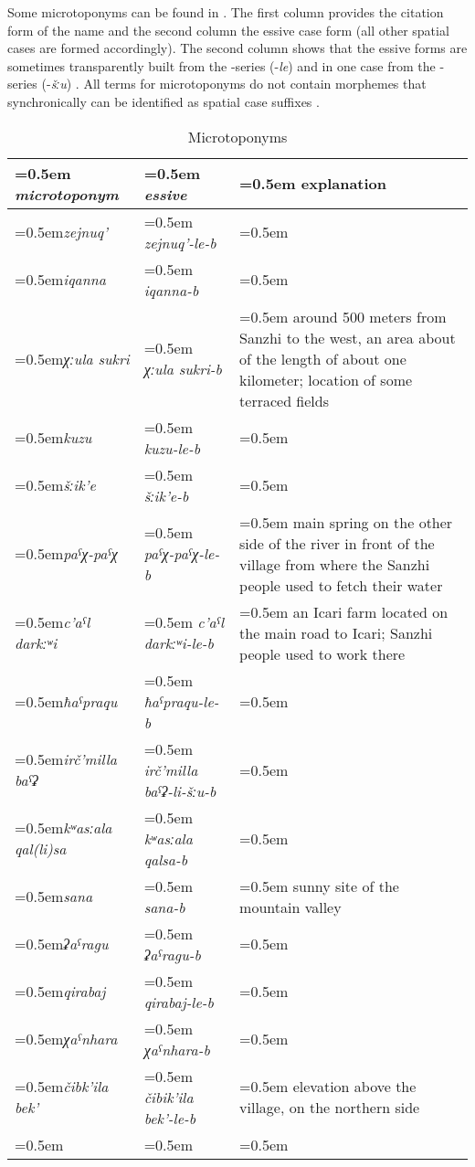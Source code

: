 Some microtoponyms can be found in . The first column provides the citation form of the name and the second column the essive case form (all other spatial cases are formed accordingly). The second column shows that the essive forms are sometimes transparently built from the -series (-\textit{le}) and in one case from the -series (-\textit{šːu}) . All terms for microtoponyms do not contain morphemes that synchronically can be identified as spatial case suffixes . 
%
\begin{table}
	\caption{Microtoponyms}
	\label{tab:Microtoponyms}
	\small
	\begin{tabularx}{0.98\textwidth}[]{%
		>{\raggedright\arraybackslash\hangindent=0.5em\itshape}p{60pt}
		>{\raggedright\arraybackslash\hangindent=0.5em\itshape}p{85pt}
		>{\raggedright\arraybackslash\hangindent=0.5em}X}
		
		\lsptoprule
		\upshape microtoponym	&	\upshape essive 	&	explanation\\
		\midrule
		zejnuq' 		&	zejnuq'-le-b 		&	\\
		iqanna		&	iqanna-b		&	\\
		χːula sukri		&	χːula sukri-b		&	around 500 meters from Sanzhi to the west, an area about of the length of about one kilometer; location of some terraced fields\\
		kuzu			&	kuzu-le-b		&	\\
		šːik'e			&	šːik'e-b		&	\\
		paˁχ-paˁχ		&	paˁχ-paˁχ-le-b 	&	main spring on the other side of the river in front of the village from where the Sanzhi people used to fetch their water\\ 
		c'aˁl darkːʷi 		&	c'aˁl darkːʷi-le-b	&	an Icari farm located on the main road to Icari; Sanzhi people used to work there\\
		ħaˁpraqu 		&	ħaˁpraqu-le-b	&	\\
		irč'milla baˁʡ		&	irč'milla baˁʡ-li-šːu-b	&	\\
		kʷasːala qal(li)sa	&	kʷasːala qalsa-b 	&	\\
		sana			&	sana-b		&	sunny site of the mountain valley\\
		ʡaˁragu 		&	ʡaˁragu-b		&	\\
		qirabaj		&	qirabaj-le-b		&	\\
		χaˁnhara 		&	χaˁnhara-b		&	\\
		čibk'ila bek'		&	čibik'ila bek'-le-b	&	elevation above the village, on the northern side\\
		\lspbottomrule
	\end{tabularx}
\end{table}

